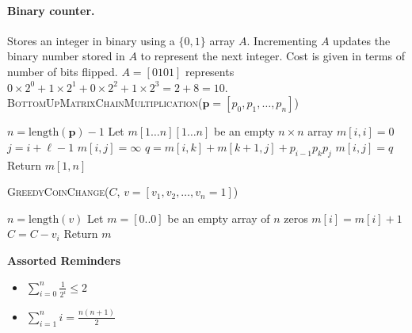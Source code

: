 \documentclass[11  pt]{exam}
\begin{document}
	
	\paragraph{Binary counter.} Stores an integer in binary using a $\{0,1\}$ array $A$. Incrementing $A$ updates the binary number stored in $A$ to represent the next integer. Cost is given in terms of number of bits flipped. $A = [0101]$ represents $0 \times 2^0 + 1 \times 2^1 + 0 \times 2^2 + 1 \times 2^3 = 2 + 8 = 10$.\\
	
	\noindent	\textsc{BottomUpMatrixChainMultiplication}($\textbf{p} = [p_0, p_1, \hdots, p_n]$)
	\begin{algorithmic}
		\State $n = \text{length}(\textbf{p})-1$
		\State Let $m[1 \hdots n][1 \hdots n]$ be an empty $n \times n$ array
		\State $m[i,i] = 0$
		\EndFor
		\State $j = i+\ell - 1$ 
		\State $m[i,j] = \infty$
		\State $q = m[i,k] + m[k+1,j] + p_{i-1}p_k p_j$
		\State $m[i,j] = q$
		\EndIf
		\EndFor
		\EndFor
		\EndFor
		\State Return $m[1,n]$
	\end{algorithmic}
	
	\noindent\textsc{GreedyCoinChange}($C$, $v = [v_1, v_2, \hdots , v_n = 1]$)
	\begin{algorithmic}
		\State $n = \text{length}(v)$
		\State Let $m = [0..0]$ be an empty array of $n$ zeros
		\For{$i = 1$ to $n$}
		\While{$C \geq v_i$}
		\State $m[i] = m[i] + 1$
		\State $C = C - v_i$
		\EndWhile
		\EndFor
		\State Return $m$
	\end{algorithmic}
	
	\noindent\textbf{Assorted Reminders}
	\begin{itemize}
		\item $\sum_{i = 0}^n \frac{1}{2^i} \leq 2$
		\item $\sum_{i = 1}^n i = \frac{n(n+1)}{2}$
	\end{itemize}

	
\end{document}
